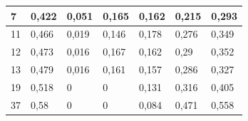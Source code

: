 \documentclass{classrep}
\begin{document}
{\begin{table}[H]
\begin{center}
\begin{tabular}{|l|l|l|l|l|l|l|}
7                                                         & 0,422                                               & 0,051                                                  & 0,165                                                   & 0,162                                                      & 0,215                                                  & 0,293                                                     \\ \hline
11                                                        & 0,466                                               & 0,019                                                  & 0,146                                                   & 0,178                                                      & 0,276                                                  & 0,349                                                     \\ \hline
12                                                        & 0,473                                               & 0,016                                                  & 0,167                                                   & 0,162                                                      & 0,29                                                   & 0,352                                                     \\ \hline
13                                                        & 0,479                                               & 0,016                                                  & 0,161                                                   & 0,157                                                      & 0,286                                                  & 0,327                                                     \\ \hline
19                                                        & 0,518                                               & 0                                                      & 0                                                       & 0,131                                                      & 0,316                                                  & 0,405                                                     \\ \hline
37                                                        & 0,58                                                & 0                                                      & 0                                                       & 0,084                                                      & 0,471                                                  & 0,558                                                     \\ \hline

\end{tabular}
\end{center}
\end{table}}
\end{document}
